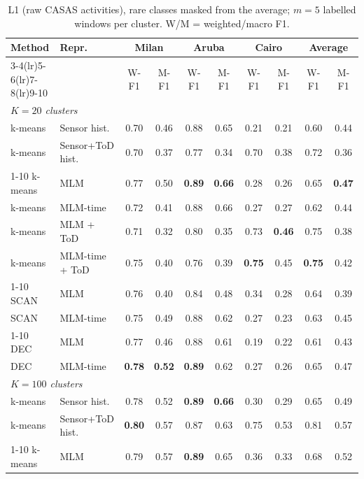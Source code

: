 \begin{table}[t]
\centering\small
\caption{L1 (raw CASAS activities), rare classes masked from the average; $m=5$ labelled windows per cluster. W/M = weighted/macro F1.}
\label{tab:l1_masked_m5}
\setlength{\tabcolsep}{4pt}
\begin{tabular}{llcccccc|cc}
\toprule
Method & Repr. & \multicolumn{2}{c}{Milan} & \multicolumn{2}{c}{Aruba} & \multicolumn{2}{c}{Cairo} & \multicolumn{2}{c}{Average} \\
\cmidrule(lr){3-4}\cmidrule(lr){5-6}\cmidrule(lr){7-8}\cmidrule(lr){9-10}
 & & W-F1 & M-F1 & W-F1 & M-F1 & W-F1 & M-F1 & W-F1 & M-F1 \\
\midrule
\multicolumn{10}{l}{\textit{$K = 20$ clusters}} \\
\midrule
k-means & Sensor hist. & 0.70 & 0.46 & 0.88 & 0.65 & 0.21 & 0.21 & 0.60 & 0.44 \\
k-means & Sensor+ToD hist. & 0.70 & 0.37 & 0.77 & 0.34 & 0.70 & 0.38 & 0.72 & 0.36 \\
\cmidrule{1-10}
k-means & MLM & 0.77 & 0.50 & \textbf{0.89} & \textbf{0.66} & 0.28 & 0.26 & 0.65 & \textbf{0.47} \\
k-means & MLM-time & 0.72 & 0.41 & 0.88 & 0.66 & 0.27 & 0.27 & 0.62 & 0.44 \\
k-means & MLM + ToD & 0.71 & 0.32 & 0.80 & 0.35 & 0.73 & \textbf{0.46} & 0.75 & 0.38 \\
k-means & MLM-time + ToD & 0.75 & 0.40 & 0.76 & 0.39 & \textbf{0.75} & 0.45 & \textbf{0.75} & 0.42 \\
\cmidrule{1-10}
SCAN & MLM & 0.76 & 0.40 & 0.84 & 0.48 & 0.34 & 0.28 & 0.64 & 0.39 \\
SCAN & MLM-time & 0.75 & 0.49 & 0.88 & 0.62 & 0.27 & 0.23 & 0.63 & 0.45 \\
\cmidrule{1-10}
DEC & MLM & 0.77 & 0.46 & 0.88 & 0.61 & 0.19 & 0.22 & 0.61 & 0.43 \\
DEC & MLM-time & \textbf{0.78} & \textbf{0.52} & \textbf{0.89} & 0.62 & 0.27 & 0.26 & 0.65 & 0.47 \\
\midrule
\multicolumn{10}{l}{\textit{$K = 100$ clusters}} \\
\midrule
k-means & Sensor hist. & 0.78 & 0.52 & \textbf{0.89} & \textbf{0.66} & 0.30 & 0.29 & 0.65 & 0.49 \\
k-means & Sensor+ToD hist. & \textbf{0.80} & 0.57 & 0.87 & 0.63 & 0.75 & 0.53 & 0.81 & 0.57 \\
\cmidrule{1-10}
k-means & MLM & 0.79 & 0.57 & \textbf{0.89} & 0.65 & 0.36 & 0.33 & 0.68 & 0.52 \\

\end{tabular}
\end{table}
